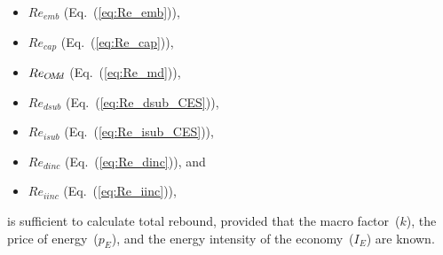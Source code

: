 \begin{itemize}

  \item $Re_{emb}$ (Eq.~(\ref{eq:Re_emb})),

  \item $Re_{cap}$ (Eq.~(\ref{eq:Re_cap})),

  \item $Re_{O\!M\!d}$ (Eq.~(\ref{eq:Re_md})),

  \item $Re_{dsub}$ (Eq.~(\ref{eq:Re_dsub_CES})),

  \item $Re_{isub}$ (Eq.~(\ref{eq:Re_isub_CES})),

  \item $Re_{dinc}$ (Eq.~(\ref{eq:Re_dinc})), and

  \item $Re_{iinc}$ (Eq.~(\ref{eq:Re_iinc})),

\end{itemize}
%
is sufficient to calculate total rebound,
provided that
the macro factor~($k$),
the price of energy~($p_E$), and
the energy intensity of the economy~($I_E$)
are known.
